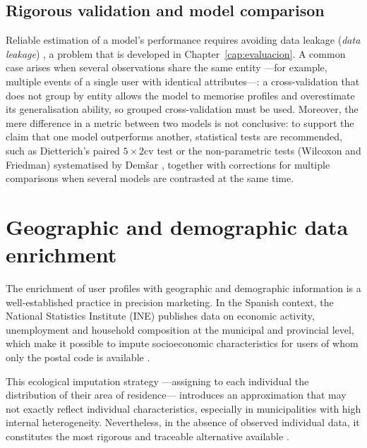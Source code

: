 \subsection{Rigorous validation and model comparison}

Reliable estimation of a model's performance requires avoiding data leakage (\textit{data leakage}) \cite{kaufman2012leakage}, a problem that is developed in Chapter~\ref{cap:evaluacion}. A common case arises when several observations share the same entity ---for example, multiple events of a single user with identical attributes---: a cross-validation that does not group by entity allows the model to memorise profiles and overestimate its generalisation ability, so grouped cross-validation must be used. Moreover, the mere difference in a metric between two models is not conclusive: to support the claim that one model outperforms another, statistical tests are recommended, such as Dietterich's paired $5\times2$cv test \cite{dietterich1998} or the non-parametric tests (Wilcoxon and Friedman) systematised by Dem\v{s}ar \cite{demsar2006}, together with corrections for multiple comparisons when several models are contrasted at the same time.

\section{Geographic and demographic data enrichment}

The enrichment of user profiles with geographic and demographic information is a well-established practice in precision marketing. In the Spanish context, the National Statistics Institute (INE) publishes data on economic activity, unemployment and household composition at the municipal and provincial level, which make it possible to impute socioeconomic characteristics for users of whom only the postal code is available \cite{ine2025}.

This ecological imputation strategy ---assigning to each individual the distribution of their area of residence--- introduces an approximation that may not exactly reflect individual characteristics, especially in municipalities with high internal heterogeneity. Nevertheless, in the absence of observed individual data, it constitutes the most rigorous and traceable alternative available \cite{greenland2001}.
